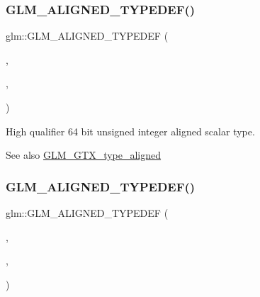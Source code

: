 \subsubsection{\texorpdfstring{G\+L\+M\+\_\+\+A\+L\+I\+G\+N\+E\+D\+\_\+\+T\+Y\+P\+E\+D\+E\+F()}{GLM\_ALIGNED\_TYPEDEF()}\hspace{0.1cm}{\footnotesize\ttfamily [100/209]}}
{\footnotesize\ttfamily glm\+::\+G\+L\+M\+\_\+\+A\+L\+I\+G\+N\+E\+D\+\_\+\+T\+Y\+P\+E\+D\+EF (\begin{DoxyParamCaption}\item[{\hyperlink{group__gtc__type__precision_ga6e66f40c5909bfc872b068187fa6029e}{highp\+\_\+uint64\+\_\+t}}]{,  }\item[{aligned\+\_\+highp\+\_\+uint64\+\_\+t}]{,  }\item[{8}]{ }\end{DoxyParamCaption})}

High qualifier 64 bit unsigned integer aligned scalar type. \begin{DoxySeeAlso}{See also}
\hyperlink{group__gtx__type__aligned}{G\+L\+M\+\_\+\+G\+T\+X\+\_\+type\+\_\+aligned} 
\end{DoxySeeAlso}
\mbox{\label{group__gtx__type__aligned_ga8942e09f479489441a7a5004c6d8cb66}} 
\subsubsection{\texorpdfstring{G\+L\+M\+\_\+\+A\+L\+I\+G\+N\+E\+D\+\_\+\+T\+Y\+P\+E\+D\+E\+F()}{GLM\_ALIGNED\_TYPEDEF()}\hspace{0.1cm}{\footnotesize\ttfamily [101/209]}}
{\footnotesize\ttfamily glm\+::\+G\+L\+M\+\_\+\+A\+L\+I\+G\+N\+E\+D\+\_\+\+T\+Y\+P\+E\+D\+EF (\begin{DoxyParamCaption}\item[{\hyperlink{group__gtc__type__precision_ga8a60abe782749c504fb5ae51eb8b49cc}{highp\+\_\+u8}}]{,  }\item[{aligned\+\_\+highp\+\_\+u8}]{,  }\item[{1}]{ }\end{DoxyParamCaption})}

